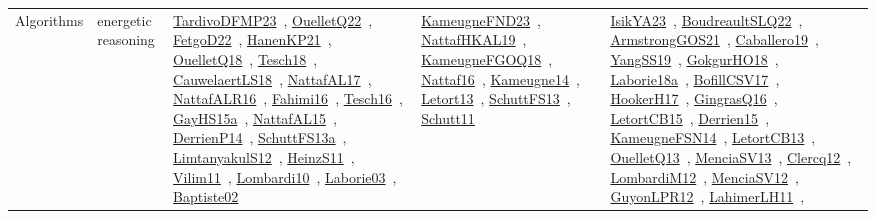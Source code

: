 {\begin{longtable}{lp{3cm}>{\raggedright\arraybackslash}p{6cm}>{\raggedright\arraybackslash}p{6cm}>{\raggedright\arraybackslash}p{8cm}}
Algorithms & energetic reasoning & \href{../works/TardivoDFMP23.pdf}{TardivoDFMP23}~\cite{TardivoDFMP23}, \href{../works/OuelletQ22.pdf}{OuelletQ22}~\cite{OuelletQ22}, \href{../works/FetgoD22.pdf}{FetgoD22}~\cite{FetgoD22}, \href{../works/HanenKP21.pdf}{HanenKP21}~\cite{HanenKP21}, \href{../works/OuelletQ18.pdf}{OuelletQ18}~\cite{OuelletQ18}, \href{../works/Tesch18.pdf}{Tesch18}~\cite{Tesch18}, \href{../works/CauwelaertLS18.pdf}{CauwelaertLS18}~\cite{CauwelaertLS18}, \href{../works/NattafAL17.pdf}{NattafAL17}~\cite{NattafAL17}, \href{../works/NattafALR16.pdf}{NattafALR16}~\cite{NattafALR16}, \href{../works/Fahimi16.pdf}{Fahimi16}~\cite{Fahimi16}, \href{../works/Tesch16.pdf}{Tesch16}~\cite{Tesch16}, \href{../works/GayHS15a.pdf}{GayHS15a}~\cite{GayHS15a}, \href{../works/NattafAL15.pdf}{NattafAL15}~\cite{NattafAL15}, \href{../works/DerrienP14.pdf}{DerrienP14}~\cite{DerrienP14}, \href{../works/SchuttFS13a.pdf}{SchuttFS13a}~\cite{SchuttFS13a}, \href{../works/LimtanyakulS12.pdf}{LimtanyakulS12}~\cite{LimtanyakulS12}, \href{../works/HeinzS11.pdf}{HeinzS11}~\cite{HeinzS11}, \href{../works/Vilim11.pdf}{Vilim11}~\cite{Vilim11}, \href{../works/Lombardi10.pdf}{Lombardi10}~\cite{Lombardi10}, \href{../works/Laborie03.pdf}{Laborie03}~\cite{Laborie03}, \href{../works/Baptiste02.pdf}{Baptiste02}~\cite{Baptiste02} & \href{../works/KameugneFND23.pdf}{KameugneFND23}~\cite{KameugneFND23}, \href{../works/NattafHKAL19.pdf}{NattafHKAL19}~\cite{NattafHKAL19}, \href{../works/KameugneFGOQ18.pdf}{KameugneFGOQ18}~\cite{KameugneFGOQ18}, \href{../works/Nattaf16.pdf}{Nattaf16}~\cite{Nattaf16}, \href{../works/Kameugne14.pdf}{Kameugne14}~\cite{Kameugne14}, \href{../works/Letort13.pdf}{Letort13}~\cite{Letort13}, \href{../works/SchuttFS13.pdf}{SchuttFS13}~\cite{SchuttFS13}, \href{../works/Schutt11.pdf}{Schutt11}~\cite{Schutt11} & \href{../works/IsikYA23.pdf}{IsikYA23}~\cite{IsikYA23}, \href{../works/BoudreaultSLQ22.pdf}{BoudreaultSLQ22}~\cite{BoudreaultSLQ22}, \href{../works/ArmstrongGOS21.pdf}{ArmstrongGOS21}~\cite{ArmstrongGOS21}, \href{../works/Caballero19.pdf}{Caballero19}~\cite{Caballero19}, \href{../works/YangSS19.pdf}{YangSS19}~\cite{YangSS19}, \href{../works/GokgurHO18.pdf}{GokgurHO18}~\cite{GokgurHO18}, \href{../works/Laborie18a.pdf}{Laborie18a}~\cite{Laborie18a}, \href{../works/BofillCSV17.pdf}{BofillCSV17}~\cite{BofillCSV17}, \href{../works/HookerH17.pdf}{HookerH17}~\cite{HookerH17}, \href{../works/GingrasQ16.pdf}{GingrasQ16}~\cite{GingrasQ16}, \href{../works/LetortCB15.pdf}{LetortCB15}~\cite{LetortCB15}, \href{../works/Derrien15.pdf}{Derrien15}~\cite{Derrien15}, \href{../works/KameugneFSN14.pdf}{KameugneFSN14}~\cite{KameugneFSN14}, \href{../works/LetortCB13.pdf}{LetortCB13}~\cite{LetortCB13}, \href{../works/OuelletQ13.pdf}{OuelletQ13}~\cite{OuelletQ13}, \href{../works/MenciaSV13.pdf}{MenciaSV13}~\cite{MenciaSV13}, \href{../works/Clercq12.pdf}{Clercq12}~\cite{Clercq12}, \href{../works/LombardiM12.pdf}{LombardiM12}~\cite{LombardiM12}, \href{../works/MenciaSV12.pdf}{MenciaSV12}~\cite{MenciaSV12}, \href{../works/GuyonLPR12.pdf}{GuyonLPR12}~\cite{GuyonLPR12}, \href{../works/LahimerLH11.pdf}{LahimerLH11}~\cite{LahimerLH11}, 
\end{longtable}}

